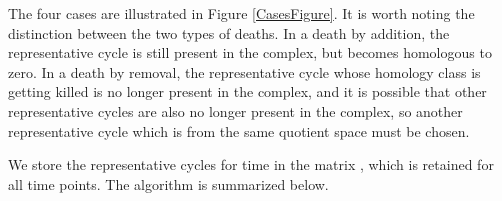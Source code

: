 \documentclass[12pt]{article}
\begin{document}
The four cases are illustrated in Figure \ref{CasesFigure}. It is worth noting the distinction between the two types of deaths. In a death by addition, the representative cycle is still present in the complex, but becomes homologous to zero. In a death by removal, the representative cycle whose homology class is getting killed is no longer present in the complex, and it is possible that other representative cycles are also no longer present in the complex, so another representative cycle which is from the same quotient space must be chosen.

We store the representative cycles for time  in the matrix , which is retained for all time points. The algorithm is summarized below.

\end{document}
